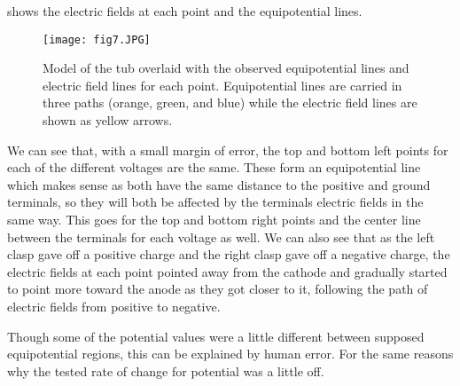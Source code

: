 ﻿\documentclass[10pt,journal,twoside]{IEEEtran}
\begin{document}
 shows the electric fields at each point and the equipotential lines. 
\begin{figure}
\begin{center}
\texttt{[image: fig7.JPG]}
\end{center}
\caption{Model of the tub overlaid with the observed equipotential lines and electric field lines for each point. Equipotential lines are carried in three paths (orange, green, and blue) while the electric field lines are shown as yellow arrows.}
\label{fig:7}
\end{figure}

We can see that, with a small margin of error, the top and bottom left points for each of the different voltages are the same. These form an equipotential line which makes sense as both have the same distance to the positive and ground terminals, so they will both be affected by the terminals electric fields in the same way. This goes for the top and bottom right points and the center line between the terminals for each voltage as well. We can also see that as the left clasp gave off a positive charge and the right clasp gave off a negative charge, the electric fields at each point pointed away from the cathode and gradually started to point more toward the anode as they got closer to it, following the path of electric fields from positive to negative.

Though some of the potential values were a little different between supposed equipotential regions, this can be explained by human error. For the same reasons why the tested rate of change for potential was a little off.
\end{document}
